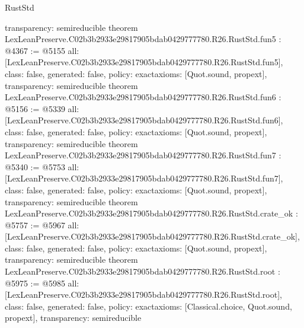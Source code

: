 \begin{lexlean}{RustStd}
\begin{coremodule}
{  transparency: semireducible
}
theorem LexLeanPreserve.C02b3b2933e29817905bdab0429777780.R26.RustStd.fun5 : @4367 := @5155 {
  all: [LexLeanPreserve.C02b3b2933e29817905bdab0429777780.R26.RustStd.fun5],
  class: false,
  generated: false,
  policy: exact{axioms: [Quot.sound, propext]},
  transparency: semireducible
}
theorem LexLeanPreserve.C02b3b2933e29817905bdab0429777780.R26.RustStd.fun6 : @5156 := @5339 {
  all: [LexLeanPreserve.C02b3b2933e29817905bdab0429777780.R26.RustStd.fun6],
  class: false,
  generated: false,
  policy: exact{axioms: [Quot.sound, propext]},
  transparency: semireducible
}
theorem LexLeanPreserve.C02b3b2933e29817905bdab0429777780.R26.RustStd.fun7 : @5340 := @5753 {
  all: [LexLeanPreserve.C02b3b2933e29817905bdab0429777780.R26.RustStd.fun7],
  class: false,
  generated: false,
  policy: exact{axioms: [Quot.sound, propext]},
  transparency: semireducible
}
theorem LexLeanPreserve.C02b3b2933e29817905bdab0429777780.R26.RustStd.crate_ok : @5757 := @5967 {
  all: [LexLeanPreserve.C02b3b2933e29817905bdab0429777780.R26.RustStd.crate_ok],
  class: false,
  generated: false,
  policy: exact{axioms: [Quot.sound, propext]},
  transparency: semireducible
}
theorem LexLeanPreserve.C02b3b2933e29817905bdab0429777780.R26.RustStd.root : @5975 := @5985 {
  all: [LexLeanPreserve.C02b3b2933e29817905bdab0429777780.R26.RustStd.root],
  class: false,
  generated: false,
  policy: exact{axioms: [Classical.choice, Quot.sound, propext]},
  transparency: semireducible
}


\end{coremodule}
\end{lexlean}
